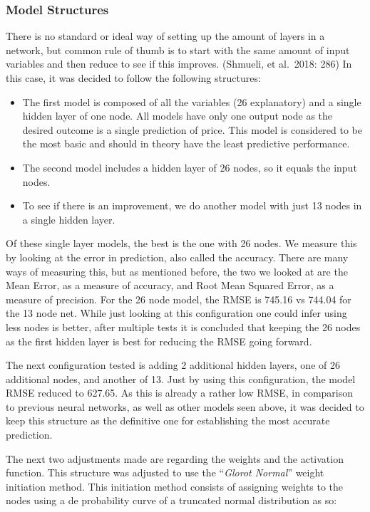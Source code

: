 \documentclass[
  paper=a4,
  ,captions=tableheading
]{scrartcl}
\begin{document}
\hypertarget{model-structures}{%
\subsubsection{Model Structures}\label{model-structures}}

There is no standard or ideal way of setting up the amount of layers in
a network, but common rule of thumb is to start with the same amount of
input variables and then reduce to see if this improves. (Shmueli, et
al.~2018: 286) In this case, it was decided to follow the following
structures:

\begin{itemize}
\item
  The first model is composed of all the variables (26 explanatory) and
  a single hidden layer of one node. All models have only one output
  node as the desired outcome is a single prediction of price. This
  model is considered to be the most basic and should in theory have the
  least predictive performance.
\item
  The second model includes a hidden layer of 26 nodes, so it equals the
  input nodes.
\item
  To see if there is an improvement, we do another model with just 13
  nodes in a single hidden layer.
\end{itemize}

Of these single layer models, the best is the one with 26 nodes. We
measure this by looking at the error in prediction, also called the
accuracy. There are many ways of measuring this, but as mentioned
before, the two we looked at are the Mean Error, as a measure of
accuracy, and Root Mean Squared Error, as a measure of precision. For
the 26 node model, the RMSE is 745.16 vs 744.04 for the 13 node net.
While just looking at this configuration one could infer using less
nodes is better, after multiple tests it is concluded that keeping the
26 nodes as the first hidden layer is best for reducing the RMSE going
forward.

The next configuration tested is adding 2 additional hidden layers, one
of 26 additional nodes, and another of 13. Just by using this
configuration, the model RMSE reduced to 627.65. As this is already a
rather low RMSE, in comparison to previous neural networks, as well as
other models seen above, it was decided to keep this structure as the
definitive one for establishing the most accurate prediction.

The next two adjustments made are regarding the weights and the
activation function. This structure was adjusted to use the
``\emph{Glorot Normal}'' weight initiation method. This initiation
method consists of assigning weights to the nodes using a de probability
curve of a truncated normal distribution as so:
\end{document}
